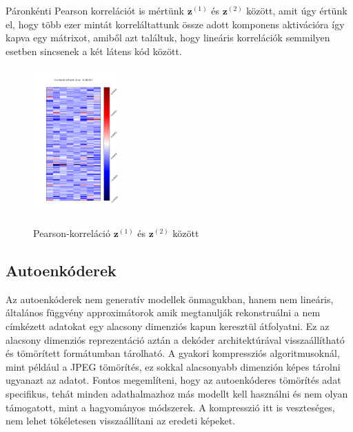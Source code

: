 \documentclass[12pt, english]{article}
\begin{document}
\vspace{4mm}

\par Páronkénti Pearson korrelációt is mértünk $\bm{z}^{(1)}$ és $\bm{z}^{(2)}$ között, amit úgy értünk el, hogy több ezer mintát korreláltattunk össze adott komponens aktivációra így kapva egy mátrixot, amiből azt találtuk, hogy lineáris korrelációk semmilyen esetben sincsenek a két látens kód között.

\vspace{4mm}

\begin{figure}[H]
    \centering
    \includegraphics[width=0.3\textwidth]{z1_z2_correlation.png}
    \label{fig:pearson-matrix}
    \caption{Pearson-korreláció $\bm{z}^{(1)}$ és $\bm{z}^{(2)}$ között}
\end{figure}

\vspace{7mm}

\subsection{Autoenkóderek}

\vspace{5mm}

\par Az autoenkóderek nem generatív modellek önmagukban, hanem nem lineáris, általános függvény approximátorok amik megtanulják rekonstruálni a nem címkézett adatokat egy alacsony dimenziós kapun keresztül átfolyatni. Ez az alacsony dimenziós reprezentáció aztán a dekóder architektúrával visszaállítható és tömörített formátumban tárolható. A gyakori kompressziós algoritmusoknál, mint például a JPEG tömörítés, ez sokkal alacsonyabb dimenzión képes tárolni ugyanazt az adatot. Fontos megemlíteni, hogy az autoenkóderes tömörítés adat specifikus, tehát minden adathalmazhoz más modellt kell használni és nem olyan támogatott, mint a hagyományos módszerek. A kompresszió itt is veszteséges, nem lehet tökéletesen visszaállítani az eredeti képeket.
\end{document}
